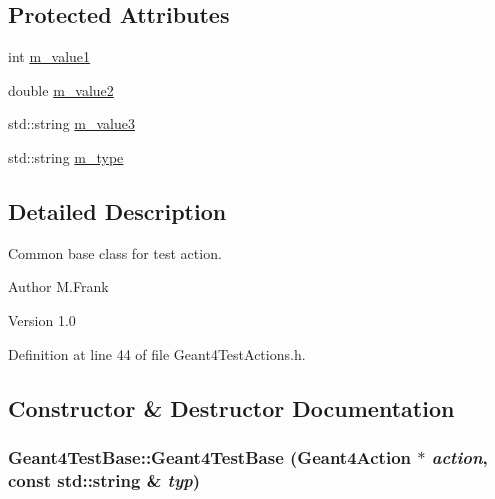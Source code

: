 \subsection*{Protected Attributes}
\begin{DoxyCompactItemize}
\item 
int \hyperlink{class_d_d4hep_1_1_simulation_1_1_test_1_1_geant4_test_base_ae953f3bd81b4ee602820d75dd39ddceb}{m\_\-value1}
\item 
double \hyperlink{class_d_d4hep_1_1_simulation_1_1_test_1_1_geant4_test_base_a782a7fd9a4c6920190976bfc7220c53e}{m\_\-value2}
\item 
std::string \hyperlink{class_d_d4hep_1_1_simulation_1_1_test_1_1_geant4_test_base_a47f59388ee7476f251564abf651de4b5}{m\_\-value3}
\item 
std::string \hyperlink{class_d_d4hep_1_1_simulation_1_1_test_1_1_geant4_test_base_aadfad14d5fb2fa03ca24c8ed07ec190d}{m\_\-type}
\end{DoxyCompactItemize}


\subsection{Detailed Description}
Common base class for test action. \begin{DoxyAuthor}{Author}
M.Frank 
\end{DoxyAuthor}
\begin{DoxyVersion}{Version}
1.0 
\end{DoxyVersion}


Definition at line 44 of file Geant4TestActions.h.

\subsection{Constructor \& Destructor Documentation}
\hypertarget{class_d_d4hep_1_1_simulation_1_1_test_1_1_geant4_test_base_aa66e1731de4829c114fd6fd8452a795b}{
\subsubsection[{Geant4TestBase}]{\setlength{\rightskip}{0pt plus 5cm}Geant4TestBase::Geant4TestBase ({\bf Geant4Action} $\ast$ {\em action}, \/  const std::string \& {\em typ})}}
\label{class_d_d4hep_1_1_simulation_1_1_test_1_1_geant4_test_base_aa66e1731de4829c114fd6fd8452a795b}



